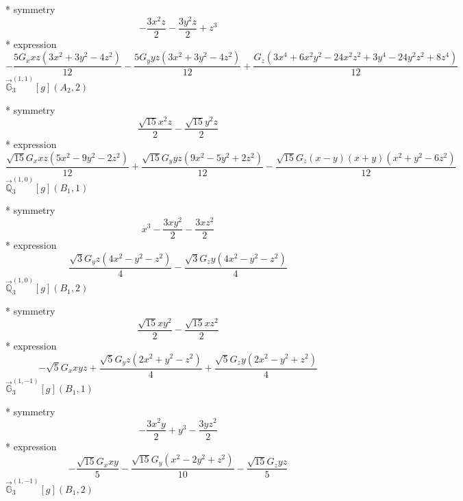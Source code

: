 \documentclass[fleqn,8pt]{jsarticle}
\begin{document}
\noindent\quad ** symmetry
\begin{dmath*}
- \frac{3 x^{2} z}{2} - \frac{3 y^{2} z}{2} + z^{3}
\end{dmath*}
\noindent\quad ** expression
\begin{dmath*}
- \frac{5 G_{x} x z \left(3 x^{2} + 3 y^{2} - 4 z^{2}\right)}{12} - \frac{5 G_{y} y z \left(3 x^{2} + 3 y^{2} - 4 z^{2}\right)}{12} + \frac{G_{z} \left(3 x^{4} + 6 x^{2} y^{2} - 24 x^{2} z^{2} + 3 y^{4} - 24 y^{2} z^{2} + 8 z^{4}\right)}{12}
\end{dmath*}
\noindent\quad $\vec{\mathbb{G}}_{3}^{(1,1)}[g](A_{2},2)$

\noindent\quad ** symmetry
\begin{dmath*}
\frac{\sqrt{15} x^{2} z}{2} - \frac{\sqrt{15} y^{2} z}{2}
\end{dmath*}
\noindent\quad ** expression
\begin{dmath*}
\frac{\sqrt{15} G_{x} x z \left(5 x^{2} - 9 y^{2} - 2 z^{2}\right)}{12} + \frac{\sqrt{15} G_{y} y z \left(9 x^{2} - 5 y^{2} + 2 z^{2}\right)}{12} - \frac{\sqrt{15} G_{z} \left(x - y\right) \left(x + y\right) \left(x^{2} + y^{2} - 6 z^{2}\right)}{12}
\end{dmath*}
\noindent\quad $\vec{\mathbb{Q}}_{3}^{(1,0)}[g](B_{1},1)$

\noindent\quad ** symmetry
\begin{dmath*}
x^{3} - \frac{3 x y^{2}}{2} - \frac{3 x z^{2}}{2}
\end{dmath*}
\noindent\quad ** expression
\begin{dmath*}
\frac{\sqrt{3} G_{y} z \left(4 x^{2} - y^{2} - z^{2}\right)}{4} - \frac{\sqrt{3} G_{z} y \left(4 x^{2} - y^{2} - z^{2}\right)}{4}
\end{dmath*}
\noindent\quad $\vec{\mathbb{Q}}_{3}^{(1,0)}[g](B_{1},2)$

\noindent\quad ** symmetry
\begin{dmath*}
\frac{\sqrt{15} x y^{2}}{2} - \frac{\sqrt{15} x z^{2}}{2}
\end{dmath*}
\noindent\quad ** expression
\begin{dmath*}
- \sqrt{5} G_{x} x y z + \frac{\sqrt{5} G_{y} z \left(2 x^{2} + y^{2} - z^{2}\right)}{4} + \frac{\sqrt{5} G_{z} y \left(2 x^{2} - y^{2} + z^{2}\right)}{4}
\end{dmath*}
\noindent\quad $\vec{\mathbb{G}}_{3}^{(1,-1)}[g](B_{1},1)$

\noindent\quad ** symmetry
\begin{dmath*}
- \frac{3 x^{2} y}{2} + y^{3} - \frac{3 y z^{2}}{2}
\end{dmath*}
\noindent\quad ** expression
\begin{dmath*}
- \frac{\sqrt{15} G_{x} x y}{5} - \frac{\sqrt{15} G_{y} \left(x^{2} - 2 y^{2} + z^{2}\right)}{10} - \frac{\sqrt{15} G_{z} y z}{5}
\end{dmath*}
\noindent\quad $\vec{\mathbb{G}}_{3}^{(1,-1)}[g](B_{1},2)$
\end{document}
